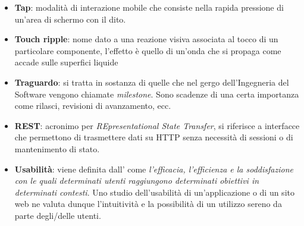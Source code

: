 \begin{itemize}
\item \textbf{Tap}: modalità di interazione mobile che consiste nella rapida pressione
di un'area di schermo con il dito.

\item \textbf{Touch ripple}: nome dato a una reazione visiva associata al tocco di un
particolare componente, l'effetto è quello di un'onda che si propaga come accade sulle
superfici liquide

\item \textbf{Traguardo}: si tratta in sostanza di quelle che nel gergo dell'Ingegneria del
Software vengono chiamate \textit{milestone}. Sono scadenze di una certa importanza come
rilasci, revisioni di avanzamento, ecc.

\item \textbf{REST}: acronimo per \textit{REpresentational State Transfer}, si riferisce a
interfacce che permettono di trasmettere dati su HTTP senza necessità di sessioni o di
mantenimento di stato.

\item \textbf{Usabilità}: viene definita dall' come \textit{l'efficacia, l'efficienza
e la soddisfazione con le quali determinati utenti raggiungono determinati obiettivi in
determinati contesti}. Uno studio dell'usabilità di un'applicazione o di un sito web ne valuta
dunque l'intuitività e la possibilità di un utilizzo sereno da parte degli/delle utenti.
\end{itemize}
